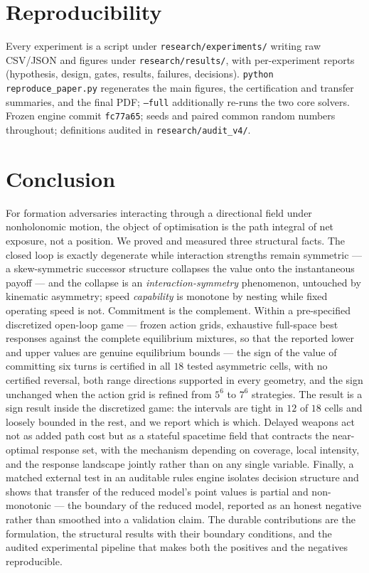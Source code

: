 \documentclass[12pt,a4paper]{article}
\begin{document}
\section{Reproducibility}\label{sec:repro}
Every experiment is a script under \texttt{research/experiments/}
writing raw CSV/JSON and figures under \texttt{research/results/}, with
per-experiment reports (hypothesis, design, gates, results, failures,
decisions).  \texttt{python reproduce\_paper.py} regenerates the main
figures, the certification and transfer summaries, and the final PDF;
\texttt{--full} additionally re-runs the two core solvers.  Frozen engine commit \texttt{fc77a65}; seeds and paired
common random numbers throughout; definitions audited in
\texttt{research/audit\_v4/}.

\section{Conclusion}\label{sec:conclusion}

For formation adversaries interacting through a directional field under
nonholonomic motion, the object of optimisation is the path integral of net
exposure, not a position.  We proved and measured three structural facts.
The closed loop is exactly degenerate while interaction strengths remain
symmetric --- a skew-symmetric successor structure collapses the value onto
the instantaneous payoff --- and the collapse is an
\emph{interaction-symmetry} phenomenon, untouched by kinematic asymmetry;
speed \emph{capability} is monotone by nesting while fixed operating speed is
not.  Commitment is the complement.  Within a pre-specified discretized
open-loop game --- frozen action grids, exhaustive full-space best
responses against the complete equilibrium mixtures, so that the reported
lower and upper values are genuine equilibrium bounds --- the sign of the
value of committing six turns is certified in all $18$ tested asymmetric
cells, with no certified reversal, both range directions supported in every
geometry, and the sign unchanged when the action grid is refined from
$5^6$ to $7^6$ strategies.  The result is a sign result inside the
discretized game: the intervals are tight in $12$ of $18$ cells and loosely
bounded in the rest, and we report which is which.  Delayed weapons act not
as added path cost but as a stateful spacetime field that contracts the
near-optimal response set, with the mechanism depending on coverage, local
intensity, and the response landscape jointly rather than on any single
variable.  Finally, a matched external test in an auditable rules engine
isolates decision structure and shows that transfer of the reduced model's
point values is partial and non-monotonic --- the boundary of the reduced
model, reported as an honest negative rather than smoothed into a validation
claim.  The durable contributions are the formulation, the structural
results with their boundary conditions, and the audited experimental
pipeline that makes both the positives and the negatives reproducible.
\end{document}
